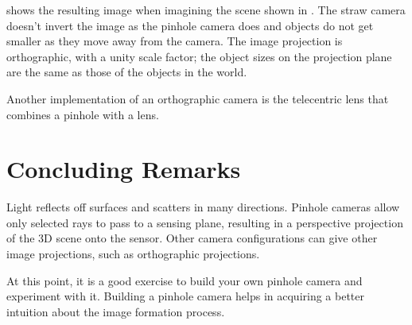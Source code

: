  shows the resulting image when imagining the scene shown in . The straw camera doesn't invert the image as the pinhole camera does and objects do not get smaller as they move away from the camera. The image projection is orthographic, with a unity scale factor; the object sizes on the projection plane are the same as those of the objects in the world.




Another implementation of an orthographic camera is the telecentric lens that combines a pinhole with a lens. 



\section{Concluding Remarks}

Light reflects off surfaces and scatters in many directions.  Pinhole cameras allow only selected rays to pass to a sensing plane, resulting in a perspective projection of the 3D scene onto the sensor.  Other camera configurations can give other image projections, such as orthographic projections.

At this point, it is a good exercise to build your own pinhole camera and experiment with it. Building a pinhole camera helps in acquiring a better intuition about the image formation process. 




